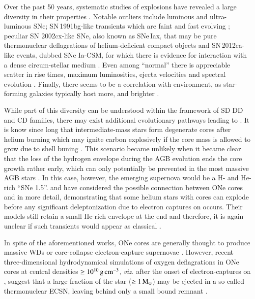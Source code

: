 \documentclass[twocolumn]{aa}
\begin{document}
Over the past 50 years, systematic studies of \ia explosions have revealed a large
diversity in their properties \citep{Taubenberger:2017hoo}. 
Notable outliers include luminous 
\citep[e.g. SN\,1991T;][]{filippenko1992} and ultra-luminous  
\citep[e.g. SNLS-03D3bb;][]{Howell:2006vn} SNe; SN\,1991bg-like transients which
are faint and fast evolving  \citep{ruiz-lapuente1993};  peculiar SN 2002cx-like SNe, 
also known as SNe\,Iax, that may be pure thermonuclear deflagrations of helium-deficient compact objects \citep[e.g.][]{Li:2003wja,Branch:2004tq,Magee:2016vnu,Jha:2017gwq, Magee:2018aui}
and SN\,2012ca-like events, dubbed SNe Ia-CSM, for which 
there is evidence for interaction with a dense circum-stellar 
medium \citep{Bochenek:2017vok}. 
Even among ``normal'' \ias there is appreciable
scatter in rise times, maximum luminosities, ejecta velocities and spectral evolution   
\citep[][]{Livio:2018rue}. 
Finally, there seems to be a correlation with environment, 
as star-forming  galaxies typically  host more,  and brighter \ias \citep{Maoz:2013hna}. 


While part of this diversity can be understood within the framework of SD  DD and CD  
families, there may exist additional 
evolutionary pathways leading to \ias. 
It is know since long that intermediate-mass stars form
degenerate cores after helium burning which may ignite carbon
explosively if the core mass is allowed to grow due to shell buning
\citep{rose1969,Arnett:1969,wheeler1978}. This scenario became unlikely
when it became clear that the loss of the hydrogen envelope during the
AGB evolution ends the core growth rather early, which can only
potentially be prevented in the most massive AGB stars \citep[see][and references therein]{Iben:1983ts}. 
In this case, however, the emerging supernova would be a H- and He-rich
“SNe 1.5”.
\cite{waldman2006a} and \cite{waldman2008} have considered the possible connection between ONe cores and \ias in more detail, 
demonstrating that some helium stars with \one cores can explode before any significant deleptonization due to electron captures on  occurs.
Their models  still retain a small He-rich envelope at the end and therefore, it is again unclear if such transients would appear as classical \ias. 

In spite of the aforementioned works, ONe cores are generally thought to produce massive WDs or core-collapse electron-capture supernovae \citep[ECSNe; e.g.,][]{nomoto1991,gutierrez1996,Takahashi:2013ena}. 
However, recent three-dimensional hydrodynamical 
simulations of oxygen deflagrations in ONe cores at 
central densities $\ge 10^{10}\mathrm{\,g\,cm^{-3}}$, {\it viz.} after the onset of electron-captures on , 
suggest that a large fraction of the star ($\ge 1\mathrm{\,M_\odot}$) may be 
ejected in a so-called thermonuclear ECSN, leaving 
behind only a small bound remnant \citep{Jones:2016asr,Jones:2018ule}.  
\end{document}
